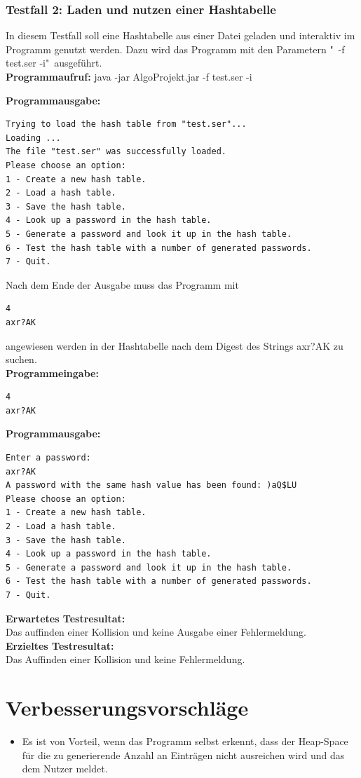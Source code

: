 \documentclass[11pt]{article}
\begin{document}
\subsubsection{Testfall 2: Laden und nutzen einer Hashtabelle}
In diesem Testfall soll eine Hashtabelle aus einer Datei geladen und interaktiv im Programm genutzt werden. Dazu wird das Programm mit den Parametern "\ -f test.ser -i"\ ausgeführt.\\
\textbf{Programmaufruf:} java -jar AlgoProjekt.jar -f test.ser -i \\
\begin{samepage}
\textbf{Programmausgabe:}
\begin{verbatim}
Trying to load the hash table from "test.ser"...
Loading ...
The file "test.ser" was successfully loaded.
Please choose an option:
1 - Create a new hash table.
2 - Load a hash table.
3 - Save the hash table.
4 - Look up a password in the hash table.
5 - Generate a password and look it up in the hash table.
6 - Test the hash table with a number of generated passwords.
7 - Quit.
\end{verbatim}
\end{samepage}
Nach dem Ende der Ausgabe muss das Programm mit \begin{verbatim}4 
axr?AK 
\end{verbatim} 
angewiesen werden in der Hashtabelle nach dem Digest des Strings axr?AK zu suchen.\\
\textbf{Programmeingabe:}
\begin{verbatim}
4
axr?AK
\end{verbatim}
\textbf{Programmausgabe:}
\begin{verbatim} 
Enter a password:
axr?AK
A password with the same hash value has been found: )aQ$LU
Please choose an option:
1 - Create a new hash table.
2 - Load a hash table.
3 - Save the hash table.
4 - Look up a password in the hash table.
5 - Generate a password and look it up in the hash table.
6 - Test the hash table with a number of generated passwords.
7 - Quit.
\end{verbatim}
\textbf{Erwartetes Testresultat:}\\
Das auffinden einer Kollision und keine Ausgabe einer Fehlermeldung.\\
\textbf{Erzieltes Testresultat:}\\
Das Auffinden einer Kollision und keine Fehlermeldung.
\newpage
\section{Verbesserungsvorschläge}
\begin{itemize}
\item Es ist von Vorteil, wenn das Programm selbst erkennt, dass der Heap-Space für die zu generierende Anzahl an Einträgen nicht ausreichen wird und das dem Nutzer meldet.
\end{itemize}
\end{document}

